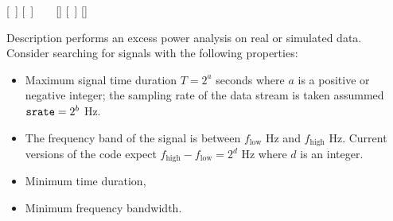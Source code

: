 \begin{entry}
 \newline \hspace*{0.5in}
[~] \newline \hspace*{0.5in}
[~] \newline \hspace*{0.5in}
~ \newline \hspace*{0.5in}
~ \newline \hspace*{0.5in}
[] \newline \hspace*{0.5in}
[~] \newline \hspace*{0.5in}
[] \newline \hspace*{0.5in}
~ \newline \hspace*{0.5in}
~ \newline \hspace*{0.5in}
~

\item[Description] 
 performs an excess power analysis on real or
simulated data.  Consider searching for signals with the following
properties:
\begin{itemize}
\item Maximum signal time duration $T=2^a$ seconds where $a$ is a positive
or negative integer;  the sampling rate of the data stream is taken
assummed $\mbox{\texttt{srate}} = 2^b$ Hz.

\item The frequency band of the signal is between $f_{\mathrm{low}}$ Hz and
${f_{\mathrm{high}}}$ Hz.  Current versions of the code expect
${f_{\mathrm{high}}}-{f_{\mathrm{low}}}=2^d$ Hz where $d$ is an integer. 

\item Minimum time duration,

\item Minimum frequency bandwidth.
\end{itemize}


\end{entry}
